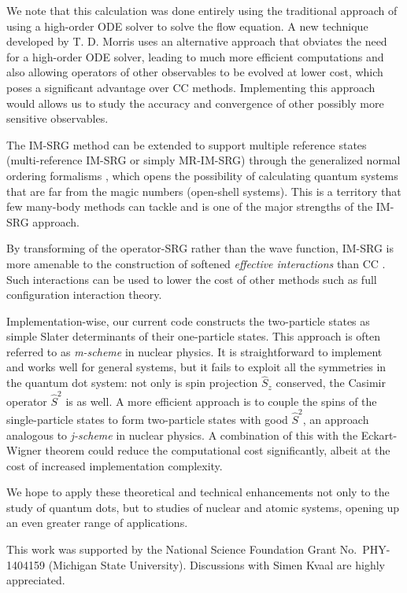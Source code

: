 We note that this calculation was done entirely using the traditional approach of using a high-order ODE solver to solve the flow equation.  A new technique developed by T. D. Morris \cite{PhysRevC.92.034331} uses an alternative approach that obviates the need for a high-order ODE solver, leading to much more efficient computations and also allowing operators of other observables to be evolved at lower cost, which poses a significant advantage over CC methods.  Implementing this approach would allows us to study the accuracy and convergence of other possibly more sensitive observables.

The IM-SRG method can be extended to support multiple reference states (multi-reference IM-SRG or simply MR-IM-SRG) \cite{PhysRevLett.110.242501,PhysRevC.90.041302} through the generalized normal ordering formalisms \cite{doi:10.1063/1.474405}, which opens the possibility of calculating quantum systems that are far from the magic numbers (open-shell systems).  This is a territory that few many-body methods can tackle and is one of the major strengths of the IM-SRG approach.

By transforming of the operator-SRG rather than the wave function, IM-SRG is more amenable to the construction of softened \textit{effective interactions} than CC \cite{Hergert2016165}.  Such interactions can be used to lower the cost of other methods such as full configuration interaction theory.

Implementation-wise, our current code constructs the two-particle states as simple Slater determinants of their one-particle states.  This approach is often referred to as \textit{m-scheme} in nuclear physics.  It is straightforward to implement and works well for general systems, but it fails to exploit all the symmetries in the quantum dot system: not only is spin projection $\hat S_z$ conserved, the Casimir operator $\hat S^2$ is as well.  A more efficient approach is to couple the spins of the single-particle states to form two-particle states with good $\hat S^2$, an approach analogous to \textit{j-scheme} in nuclear physics.  A combination of this with the Eckart-Wigner theorem could reduce the computational cost significantly, albeit at the cost of increased implementation complexity.

We hope to apply these theoretical and technical enhancements not only to the study of quantum dots, but to studies of nuclear and atomic systems, opening up an even greater range of applications.

\begin{acknowledgments}
  This work was supported by the National Science Foundation Grant No.\ PHY-1404159 (Michigan State University).  Discussions with Simen Kvaal are highly appreciated.
\end{acknowledgments}




